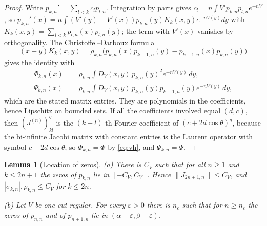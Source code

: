 \documentclass[11pt]{amsart}
\newtheorem{lemma}[theorem]{Lemma}
\theoremstyle{definition}
\theoremstyle{remark}
\numberwithin{equation}{section}
\newcommand{\eps}{\varepsilon}
\begin{document}
\begin{proof}
Write $p_{k,n}'=\sum_{l<k}c_lp_{l,n}$. Integration by parts gives $c_l=n\int V'p_{k,n}p_{l,n}e^{-nV}$, so $p_{k,n}'(x)=n\int(V'(y)-V'(x))p_{k,n}(y)K_k(x,y)e^{-nV(y)}dy$ with $K_k(x,y)=\sum_{l<k}p_{l,n}(x)p_{l,n}(y)$; the term with $V'(x)$ vanishes by orthogonality. The Christoffel--Darboux formula \cite[Theorem~3.2.2]{Sz}
\[
(x-y)K_k(x,y)=\rho_{k,n}\bigl(p_{k,n}(x)p_{k-1,n}(y)-p_{k-1,n}(x)p_{k,n}(y)\bigr)
\]
gives the identity with
\begin{align*}
\Phi_{k,n}(x)&=\rho_{k,n}\int D_V(x,y)\,p_{k,n}(y)^2e^{-nV(y)}\,dy,\\
\Psi_{k,n}(x)&=\rho_{k,n}\int D_V(x,y)\,p_{k,n}(y)p_{k-1,n}(y)e^{-nV(y)}\,dy,
\end{align*}
which are the stated matrix entries. They are polynomials in the coefficients, hence Lipschitz on bounded sets. If all the coefficients involved equal $(d,c)$, then $(J^{(n)})^q_{kl}$ is the $(k-l)$-th Fourier coefficient of $(c+2d\cos\theta)^q$, because the bi-infinite Jacobi matrix with constant entries is the Laurent operator with symbol $c+2d\cos\theta$; so $\Phi_{k,n}=\Phi$ by \eqref{eq:vh}, and $\Psi_{k,n}=\Psi$.
\end{proof}

\begin{lemma}[Location of zeros]\label{lem:outliers}
(a) There is $C_V$ such that for all $n\ge1$ and $k\le2n+1$ the zeros of $p_{k,n}$ lie in $[-C_V,C_V]$. Hence $\|J_{2n+1,n}\|\le C_V$, and $|\sigma_{k,n}|,\rho_{k,n}\le C_V$ for $k\le2n$.

(b) Let $V$ be one-cut regular. For every $\eps>0$ there is $n_\eps$ such that for $n\ge n_\eps$ the zeros of $p_{n,n}$ and of $p_{n+1,n}$ lie in $(\alpha-\eps,\beta+\eps)$.
\end{lemma}
\end{document}
